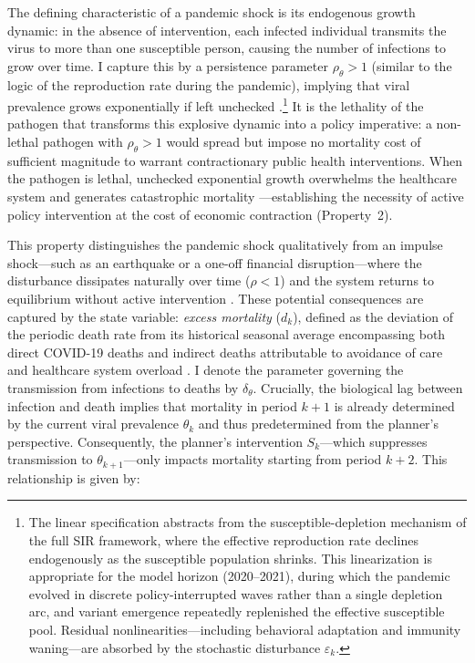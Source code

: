 \documentclass[12pt, a4paper]{article}
\begin{document}
The defining characteristic of a pandemic shock is its endogenous growth dynamic: in the absence of intervention, each infected individual transmits the virus to more than one susceptible person, causing the number of infections to grow over time. I capture this by a persistence parameter $\rho_\theta > 1$ (similar to the logic of the reproduction rate during the pandemic), implying that viral prevalence grows exponentially if left unchecked \citep{Atkeson2020, alvarez2021, eichenbaum2021macro}.\footnote{The linear specification abstracts from the susceptible-depletion mechanism of the full SIR framework, where the effective reproduction rate declines endogenously as the susceptible population shrinks. This 
linearization is appropriate for the model horizon (2020--2021), during 
which the pandemic evolved in discrete policy-interrupted waves rather than 
a single depletion arc, and variant emergence repeatedly replenished the 
effective susceptible pool. Residual nonlinearities---including behavioral 
adaptation and immunity waning---are absorbed by the stochastic disturbance 
$\varepsilon_k$.} It is the lethality of the pathogen that transforms this explosive dynamic into a policy imperative: a non-lethal pathogen with $\rho_\theta > 1$ would spread but impose no mortality cost of sufficient magnitude to warrant contractionary public health interventions. When the pathogen is lethal, unchecked exponential growth overwhelms the healthcare system and generates catastrophic mortality \citep{Jones2021, Barro2020}---establishing the necessity of active policy intervention at the cost of economic contraction (Property~2).

This property distinguishes the pandemic shock qualitatively from an impulse shock---such as an earthquake or a one-off financial disruption---where the disturbance dissipates naturally over time ($\rho < 1$) and the system returns to equilibrium without active intervention \citep{jorda2022longer}. These potential consequences are captured by the state variable: \textit{excess mortality} ($d_k$), defined as the deviation of the periodic death rate from its historical seasonal average encompassing both direct COVID-19 deaths and indirect deaths attributable to avoidance of care and healthcare system overload \citep{Msemburi2023WHO, owid_em}. I denote the parameter governing the transmission from infections to deaths by $\delta_\theta$. Crucially, the biological lag between infection and death implies that mortality in period $k+1$ is already determined by the current viral prevalence $\theta_k$ and thus predetermined from the planner's perspective. Consequently, the planner's intervention $S_k$---which suppresses transmission to $\theta_{k+1}$---only impacts mortality starting from period $k+2$. This relationship is given by:
\end{document}
